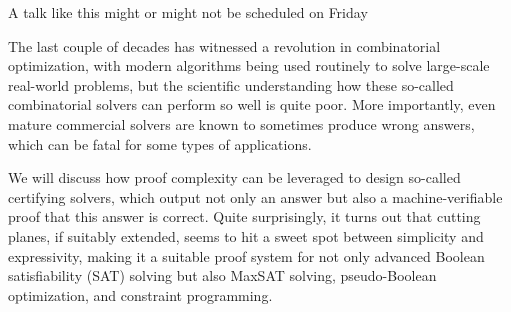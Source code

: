 \documentclass[11pt]{article}
\begin{document}
A talk like this might or might not be scheduled on Friday

The last couple of decades has witnessed a revolution in combinatorial optimization, with modern algorithms being used routinely to solve large-scale real-world problems, but the scientific understanding how these so-called combinatorial solvers can perform so well is quite poor. More importantly, even mature commercial solvers are known to sometimes produce wrong answers, which can be fatal for some types of applications.

We will discuss how proof complexity can be leveraged to design so-called certifying solvers, which output not only an answer but also a machine-verifiable proof that this answer is correct. Quite surprisingly, it turns out that cutting planes, if suitably extended, seems to hit a sweet spot between simplicity and expressivity, making it a suitable proof system for not only advanced Boolean satisfiability (SAT) solving but also MaxSAT solving, pseudo-Boolean optimization, and constraint programming.
\end{document}
